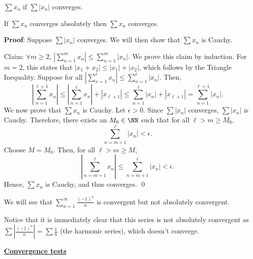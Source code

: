 \begin{definition}
$\sum x_n$  if $\sum |x_n|$ converges.
\end{definition}

\begin{theorem}
If $\sum x_n$ converges absolutely then $\sum x_n$ converges.
\end{theorem}
\textbf{Proof}: Suppose $\sum |x_n|$ converges. We will then show that $\sum x_n$ is Cauchy.

Claim: $\forall m\geq 2$, $\left|\sum_{n=1}^m x_n \right| \leq \sum_{n=1}^m |x_n|$. We prove this claim by induction. For $m=2$, this states that $|x_1 + x_2| \leq |x_1|+|x_2|$, which follows by the Triangle Inequality. Suppose for all $\left|\sum_{n=1}^\ell x_n\right| \leq \sum_{n=1}^\ell |x_n|.$ Then, 
\[
\left|\sum_{n=1}^{\ell+1} x_n\right| \leq \left|\sum_{n=1}^{\ell} x_n \right| + |x_{\ell+1}| \leq \sum_{n=1}^\ell |x_n| + |x_{\ell+1}| = \sum_{n=1}^{\ell+1} |x_n|.
\]
We now prove that $\sum x_n$ is Cauchy. Let $\epsilon >0$. Since $\sum |x_n|$ converges, $\sum |x_n|$ is Cauchy. Therefore, there exists an $M_0 \in \NN$ such that for all $\ell > m \geq M_0$, 
\[
\sum_{n=m+1}^\ell |x_n| < \epsilon.
\]
Choose $M = M_0$. Then, for all $\ell >m\geq M$, 
\[
\left|\sum_{n=m+1}^\ell x_n\right| \leq \sum_{n=m+1}^\ell |x_n| < \epsilon.
\]
Hence, $\sum x_n$ is Cauchy, and thus converges. \qed 

\begin{remark}
We will see that $\sum_{n=1}^\infty \frac{(-1)^n}{n}$ is convergent but not absolutely convergent.
\end{remark}

Notice that it is immediately clear that this series is not absolutely convergent as $\sum \left|\frac{(-1)^n}{n}\right| = \sum \frac{1}{n}$ (the harmonic series), which doesn't converge.

\newpage\noindent\underline{\textbf{Convergence tests}}

